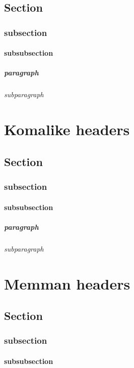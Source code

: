 \documentclass[a4paper, 12pt]{memoir}
\begin{document}
\section*{ Section }
\subsection*{subsection }
\subsubsection*{subsubsection} 
\paragraph*{paragraph} 
\subparagraph*{subparagraph} 

\chapter*{ Komalike headers } 
\section*{ Section }
\subsection*{subsection }
\subsubsection*{subsubsection} 
\paragraph*{paragraph} 
\subparagraph*{subparagraph} 


\chapter*{ Memman headers } 
\section*{ Section }
\subsection*{subsection }
\subsubsection*{subsubsection} 
\end{document}
